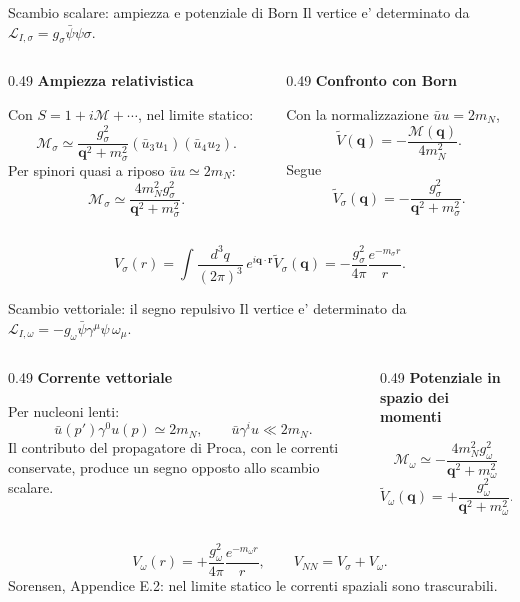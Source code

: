 \begin{frame}{Scambio scalare: ampiezza e potenziale di Born}
\footnotesize
Il vertice e' determinato da \(\mathcal L_{I,\sigma}=g_\sigma\bar\psi\psi\sigma\).
\begin{columns}[T,onlytextwidth]
\begin{column}{0.49\textwidth}
\textbf{Ampiezza relativistica}\par\smallskip
Con \(S=1+i\mathcal M+\cdots\), nel limite statico:
\[
\mathcal M_\sigma\simeq
\frac{g_\sigma^2}{\mathbf q^2+m_\sigma^2}
(\bar u_3u_1)(\bar u_4u_2).
\]
Per spinori quasi a riposo \(\bar u u\simeq2m_N\):
\[
\mathcal M_\sigma\simeq
\frac{4m_N^2g_\sigma^2}{\mathbf q^2+m_\sigma^2}.
\]
\end{column}
\begin{column}{0.49\textwidth}
\textbf{Confronto con Born}\par\smallskip
Con la normalizzazione \(\bar u u=2m_N\),
\[
\widetilde V(\mathbf q)
=-\frac{\mathcal M(\mathbf q)}{4m_N^2}.
\]
Segue
\[
\widetilde V_\sigma(\mathbf q)
=-\frac{g_\sigma^2}{\mathbf q^2+m_\sigma^2}.
\]
\end{column}
\end{columns}
\medskip
\[
V_\sigma(r)=\int\!\frac{d^3q}{(2\pi)^3}
\,e^{i\mathbf q\cdot\mathbf r}\widetilde V_\sigma(\mathbf q)
=-\frac{g_\sigma^2}{4\pi}\frac{e^{-m_\sigma r}}r.
\]
\end{frame}

\begin{frame}{Scambio vettoriale: il segno repulsivo}
\footnotesize
Il vertice e' determinato da
\(\mathcal L_{I,\omega}=-g_\omega\bar\psi\gamma^\mu\psi\,\omega_\mu\).
\begin{columns}[T,onlytextwidth]
\begin{column}{0.49\textwidth}
\textbf{Corrente vettoriale}\par\smallskip
Per nucleoni lenti:
\[
\bar u(p')\gamma^0u(p)\simeq2m_N,
\qquad\bar u\gamma^iu\ll2m_N.
\]
Il contributo del propagatore di Proca,
con le correnti conservate, produce
un segno opposto allo scambio scalare.
\end{column}
\begin{column}{0.49\textwidth}
\textbf{Potenziale in spazio dei momenti}\par\smallskip
\[
\mathcal M_\omega\simeq
-\frac{4m_N^2g_\omega^2}{\mathbf q^2+m_\omega^2}
\]
\[
\widetilde V_\omega(\mathbf q)
=+\frac{g_\omega^2}{\mathbf q^2+m_\omega^2}.
\]
\end{column}
\end{columns}
\medskip
\[
V_\omega(r)=+\frac{g_\omega^2}{4\pi}\frac{e^{-m_\omega r}}r,
\qquad V_{NN}=V_\sigma+V_\omega.
\]
\footnotesize
Sorensen, Appendice E.2: nel limite statico le correnti spaziali sono trascurabili.
\end{frame}

